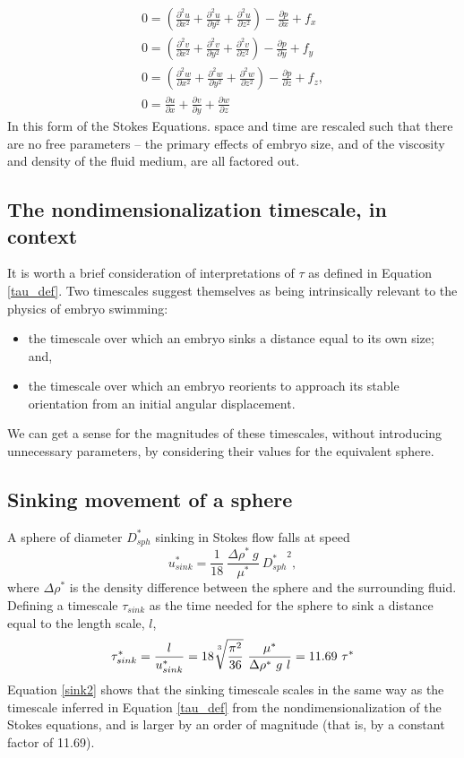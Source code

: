 \documentclass[10pt,a4paper]{article}
\def\non{\nonumber}
\def\p{\partial}
\begin{document}
\begin{eqnarray}\label{Stokes2}
	0 = \left( \frac{\p^2 u}{\p x^2}+\frac{\p^2 u}{\p y^2}+\frac{\p^2 u}{\p z^2} \right) - \frac{\p p}{\p x} + f_x \non \\
	0 = \left( \frac{\p^2 v}{\p x^2}+\frac{\p^2 v}{\p y^2}+\frac{\p^2 v}{\p z^2} \right) - \frac{\p p}{\p y} + f_y \non \\
	0 = \left( \frac{\p^2 w}{\p x^2}+\frac{\p^2 w}{\p y^2}+\frac{\p^2 w}{\p z^2} \right) - \frac{\p p}{\p z} + f_z , \non \\
	0 =  \frac{\p u}{\p {x}}+\frac{\p v}{\p {y}}+\frac{\p w}{\p {z}}
\end{eqnarray}
In this form of the Stokes Equations. space and time are rescaled such that there are no free parameters -- the primary effects of embryo size, and of the viscosity and density of the fluid medium, are all factored out.  

\subsection{The nondimensionalization timescale, in context}
It is worth a brief consideration of interpretations of $\tau$ as defined in Equation \ref{tau_def}.
Two timescales suggest themselves as being intrinsically relevant to the physics of embryo swimming:
\begin{itemize}
	\item the timescale over which an embryo sinks a distance equal to its own size; and,
	\item the timescale over which an embryo reorients to approach its stable orientation from an initial angular displacement.
\end{itemize}
We can get a sense for the magnitudes of these timescales, without introducing unnecessary parameters, by considering their values for the equivalent sphere.

\subsection{Sinking movement of a sphere}\label{SinkSect}
A sphere of diameter $D_{sph}^*$ sinking in Stokes flow falls at speed
 \begin{equation}\label{sink1}
 	u_{sink}^* = \frac{1}{18} ~ \frac{\Delta \rho^* ~ g}{\mu^*}  ~ {D_{sph}^*}^2,
 \end{equation}
where $\Delta \rho^*$ is the density difference between the sphere and the surrounding fluid.
Defining a timescale $\tau_{sink}$ as the time needed for the sphere to sink a distance equal to the length scale, $l$,
\begin{equation}\label{sink2}
	\tau^*_{sink} = \frac{l}{u_{sink}^*} = 18 \sqrt[\uproot{5}3]{\frac{\pi^2}{36}} ~ \frac{\mu^*}{\Delta \rho^* ~ g ~ l} 
	              = 11.69 ~ \tau^*
\end{equation}
Equation \ref{sink2} shows that the sinking timescale scales in the same way as the timescale inferred in Equation \ref{tau_def} from the nondimensionalization of the Stokes equations, and is larger by an order of magnitude (that is, by a constant factor of 11.69).
\end{document}
